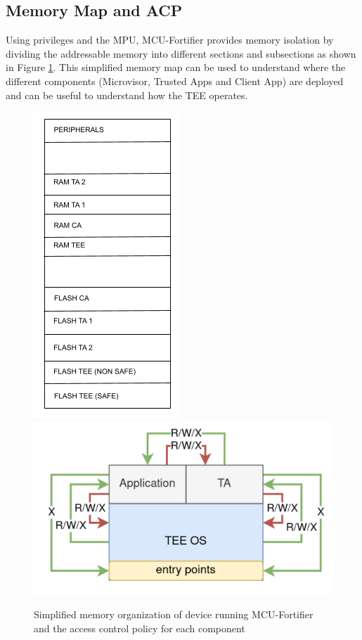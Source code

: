 \documentclass{article}
\begin{document}
\subsection{Memory Map and ACP}
Using privileges and the MPU, MCU-Fortifier provides memory isolation by dividing the addressable memory into different sections and subsections as shown in Figure \ref{fig:design_mem_map}. This simplified memory map can be used to understand where the different components (Microvisor, Trusted Apps and Client App) are deployed and can be useful to understand how the TEE operates.
\begin{figure}
	\centering
	\includegraphics[scale=0.4]{images/memory_map.png}
        \includegraphics[scale=0.30]{images/acp.png}
	\caption{Simplified memory organization of device running MCU-Fortifier and the access control policy for each component}
	\label{fig:design_mem_map}
\end{figure}
\end{document}
